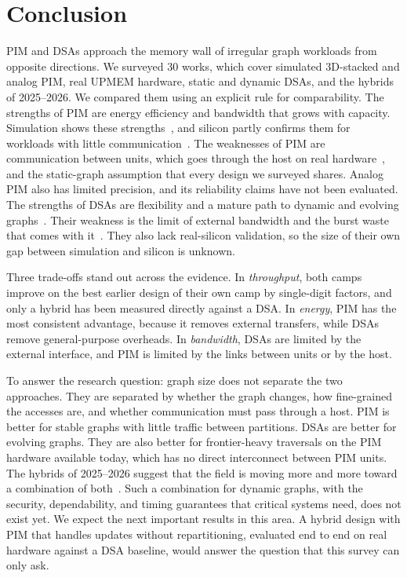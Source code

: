 \documentclass[journal,onecolumn]{IEEEtran}
\begin{document}
\section{Conclusion}
PIM and DSAs approach the memory wall of irregular graph workloads from opposite directions. We surveyed 30 works, which cover simulated 3D-stacked and analog PIM, real UPMEM hardware, static and dynamic DSAs, and the hybrids of 2025--2026. We compared them using an explicit rule for comparability. The strengths of PIM are energy efficiency and bandwidth that grows with capacity. Simulation shows these strengths~\cite{ahn2015tesseract,zhuo2019graphq}, and silicon partly confirms them for workloads with little communication~\cite{gomezluna2022prim,cai2024pimpam}. The weaknesses of PIM are communication between units, which goes through the host on real hardware~\cite{gomezluna2022prim,barkhordar2025alphapim}, and the static-graph assumption that every design we surveyed shares. Analog PIM also has limited precision, and its reliability claims have not been evaluated. The strengths of DSAs are flexibility and a mature path to dynamic and evolving graphs~\cite{rahman2021jetstream,zhao2022tdgraph,gao2023mega}. Their weakness is the limit of external bandwidth and the burst waste that comes with it~\cite{shin2025piccolo,chen2022regraph}. They also lack real-silicon validation, so the size of their own gap between simulation and silicon is unknown.

Three trade-offs stand out across the evidence. In \emph{throughput}, both camps improve on the best earlier design of their own camp by single-digit factors, and only a hybrid has been measured directly against a DSA. In \emph{energy}, PIM has the most consistent advantage, because it removes external transfers, while DSAs remove general-purpose overheads. In \emph{bandwidth}, DSAs are limited by the external interface, and PIM is limited by the links between units or by the host.

To answer the research question: graph size does not separate the two approaches. They are separated by whether the graph changes, how fine-grained the accesses are, and whether communication must pass through a host. PIM is better for stable graphs with little traffic between partitions. DSAs are better for evolving graphs. They are also better for frontier-heavy traversals on the PIM hardware available today, which has no direct interconnect between PIM units. The hybrids of 2025--2026 suggest that the field is moving more and more toward a combination of both~\cite{shin2025piccolo,shin2025fala,yenimol2026cograf}. Such a combination for dynamic graphs, with the security, dependability, and timing guarantees that critical systems need, does not exist yet. We expect the next important results in this area. A hybrid design with PIM that handles updates without repartitioning, evaluated end to end on real hardware against a DSA baseline, would answer the question that this survey can only ask.





\end{document}
